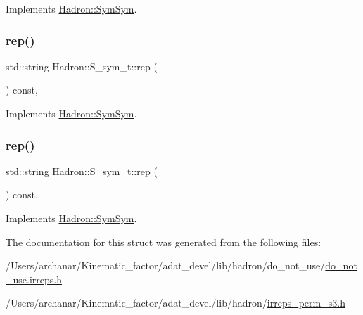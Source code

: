 Implements \mbox{\hyperlink{structHadron_1_1SymSym_aa6e588740862036933a9efe085a5e5e5}{Hadron\+::\+Sym\+Sym}}.

\mbox{\label{structHadron_1_1S__sym__t_a1a8ccb60f6d70c9a00b8683ad8eac195}} 
\subsubsection{\texorpdfstring{rep()}{rep()}\hspace{0.1cm}{\footnotesize\ttfamily [2/3]}}
{\footnotesize\ttfamily std\+::string Hadron\+::\+S\+\_\+sym\+\_\+t\+::rep (\begin{DoxyParamCaption}{ }\end{DoxyParamCaption}) const\hspace{0.3cm}{\ttfamily [inline]}, {\ttfamily [virtual]}}



Implements \mbox{\hyperlink{structHadron_1_1SymSym_aa6e588740862036933a9efe085a5e5e5}{Hadron\+::\+Sym\+Sym}}.

\mbox{\label{structHadron_1_1S__sym__t_a1a8ccb60f6d70c9a00b8683ad8eac195}} 
\subsubsection{\texorpdfstring{rep()}{rep()}\hspace{0.1cm}{\footnotesize\ttfamily [3/3]}}
{\footnotesize\ttfamily std\+::string Hadron\+::\+S\+\_\+sym\+\_\+t\+::rep (\begin{DoxyParamCaption}{ }\end{DoxyParamCaption}) const\hspace{0.3cm}{\ttfamily [inline]}, {\ttfamily [virtual]}}



Implements \mbox{\hyperlink{structHadron_1_1SymSym_aa6e588740862036933a9efe085a5e5e5}{Hadron\+::\+Sym\+Sym}}.



The documentation for this struct was generated from the following files\+:\begin{DoxyCompactItemize}
\item 
/\+Users/archanar/\+Kinematic\+\_\+factor/adat\+\_\+devel/lib/hadron/do\+\_\+not\+\_\+use/\mbox{\hyperlink{do__not__use_8irreps_8h}{do\+\_\+not\+\_\+use.\+irreps.\+h}}\item 
/\+Users/archanar/\+Kinematic\+\_\+factor/adat\+\_\+devel/lib/hadron/\mbox{\hyperlink{lib_2hadron_2irreps__perm__s3_8h}{irreps\+\_\+perm\+\_\+s3.\+h}}\end{DoxyCompactItemize}

